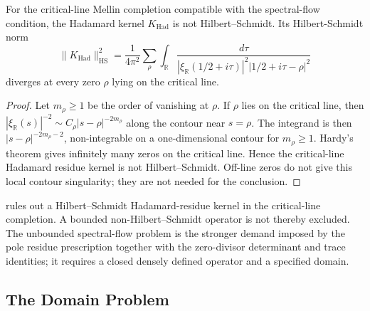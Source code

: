 \begin{lemma}
\label{v4-arith:w9-r4:lem:had-not-HS}
\ClaimStatusProvedHere For the critical-line Mellin completion
compatible with the spectral-flow condition, the Hadamard kernel
\(K_{\mathrm{Had}}\) is not Hilbert--Schmidt. Its
Hilbert-Schmidt norm
\[
 \|K_{\mathrm{Had}}\|_{\mathrm{HS}}^2
 =\frac1{4\pi^2}\sum_\rho\int_{\mathbb R}
 \frac{d\tau}{|\xi_{\mathbb R}(1/2+i\tau)|^2
              |1/2+i\tau-\rho|^2}
\]
diverges at every zero \(\rho\) lying on the critical line.
\end{lemma}

\begin{proof}
Let \(m_\rho\geq1\) be the order of vanishing at \(\rho\).
If \(\rho\) lies on the critical line, then
\(|\xi_{\mathbb{R}}(s)|^{-2}\sim C_{\rho}|s-\rho|^{-2m_{\rho}}\) along
the contour near \(s=\rho\). The integrand is then
\(|s-\rho|^{-2m_{\rho}-2}\), non-integrable on a one-dimensional
contour for \(m_{\rho}\geq 1\). Hardy's theorem gives infinitely many
zeros on the critical line. Hence the critical-line Hadamard residue
kernel is not Hilbert--Schmidt. Off-line zeros do not give this local
contour singularity; they are not needed for the conclusion.
\end{proof}

\begin{remark}
\label{v4-arith:w9-r4:rem:unboundedness-intrinsic}
 rules out a Hilbert--Schmidt
Hadamard-residue kernel in the critical-line completion. A bounded
non-Hilbert--Schmidt operator is not thereby excluded. The unbounded
spectral-flow problem is the stronger demand imposed by the pole
residue prescription together with the zero-divisor determinant and
trace identities; it requires a closed densely defined operator and a
specified domain.
\end{remark}

\subsection{The Domain Problem}
\label{v4-arith:w9-r4:obstacle-kernel:domain}

